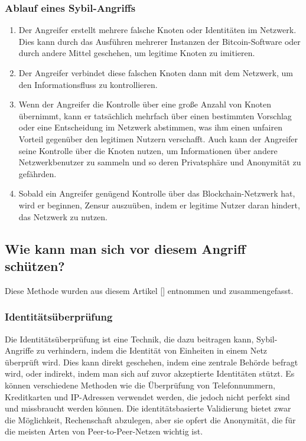 \documentclass[ngerman]{scrreprt}
\begin{document}
\subsubsection{Ablauf eines Sybil-Angriffs}
\begin{enumerate}
	\item Der Angreifer erstellt mehrere falsche Knoten oder Identitäten im Netzwerk. Dies kann durch das Ausführen mehrerer Instanzen der Bitcoin-Software oder durch andere Mittel geschehen, um legitime Knoten zu imitieren.
	
	\item Der Angreifer verbindet diese falschen Knoten dann mit dem Netzwerk, um den Informationsfluss zu kontrollieren.
	
	\item Wenn der Angreifer die Kontrolle über eine große Anzahl von Knoten übernimmt, kann er tatsächlich mehrfach über einen bestimmten Vorschlag oder eine Entscheidung im Netzwerk abstimmen, was ihm einen unfairen Vorteil gegenüber den legitimen Nutzern verschafft. Auch kann der Angreifer seine Kontrolle über die Knoten nutzen, um Informationen über andere Netzwerkbenutzer zu sammeln und so deren Privatsphäre und Anonymität zu gefährden.
	
	\item Sobald ein Angreifer genügend Kontrolle über das Blockchain-Netzwerk hat, wird er beginnen, Zensur auszuüben, indem er legitime Nutzer daran hindert, das Netzwerk zu nutzen.
	
\end{enumerate}

\subsection{Wie kann man sich vor diesem Angriff schützen?}
Diese Methode wurden aus diesem Artikel [\cite{sybil_attack}] entnommen und zusammengefasst.
\subsubsection{Identitätsüberprüfung}
Die Identitätsüberprüfung ist eine Technik, die dazu beitragen kann, Sybil-Angriffe zu verhindern, indem die Identität von Einheiten in einem Netz überprüft wird. Dies kann direkt geschehen, indem eine zentrale Behörde befragt wird, oder indirekt, indem man sich auf zuvor akzeptierte Identitäten stützt. Es können verschiedene Methoden wie die Überprüfung von Telefonnummern, Kreditkarten und IP-Adressen verwendet werden, die jedoch nicht perfekt sind und missbraucht werden können. Die identitätsbasierte Validierung bietet zwar die Möglichkeit, Rechenschaft abzulegen, aber sie opfert die Anonymität, die für die meisten Arten von Peer-to-Peer-Netzen wichtig ist.
\end{document}
